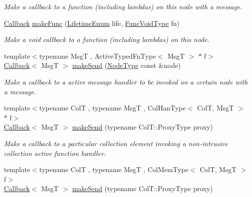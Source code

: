 \begin{DoxyCompactItemize}
\begin{DoxyCompactList}\small\item\em Make a callback to a function (including lambdas) on this node with a message. \end{DoxyCompactList}\item 
\hyperlink{namespacevt_a57b238783d05de96bc2c4027f7073b7f}{Callback} \hyperlink{structvt_1_1pipe_1_1_pipe_manager_ab1b3d375cc82e0e36e94abf7acffc8db}{make\+Func} (\hyperlink{namespacevt_1_1pipe_acb42b284378c0fdac1d7c6335dc26f58}{Lifetime\+Enum} life, \hyperlink{structvt_1_1pipe_1_1_pipe_manager_base_acd6f0c71f38f08d53f85e83b65406d77}{Func\+Void\+Type} fn)
\begin{DoxyCompactList}\small\item\em Make a void callback to a function (including lambdas) on this node. \end{DoxyCompactList}\item 
{\footnotesize template$<$typename MsgT , Active\+Typed\+Fn\+Type$<$ Msg\+T $>$ $\ast$ f$>$ }\\\hyperlink{namespacevt_a57b238783d05de96bc2c4027f7073b7f}{Callback}$<$ MsgT $>$ \hyperlink{structvt_1_1pipe_1_1_pipe_manager_a73583be6260418b13ee66e56cdade2da}{make\+Send} (\hyperlink{namespacevt_a866da9d0efc19c0a1ce79e9e492f47e2}{Node\+Type} const \&node)
\begin{DoxyCompactList}\small\item\em Make a callback to a active message handler to be invoked on a certain node with a message. \end{DoxyCompactList}\item 
{\footnotesize template$<$typename ColT , typename MsgT , Col\+Han\+Type$<$ Col\+T, Msg\+T $>$ $\ast$ f$>$ }\\\hyperlink{namespacevt_a57b238783d05de96bc2c4027f7073b7f}{Callback}$<$ MsgT $>$ \hyperlink{structvt_1_1pipe_1_1_pipe_manager_a612b59953b949edc575577e313e3b187}{make\+Send} (typename Col\+T\+::\+Proxy\+Type proxy)
\begin{DoxyCompactList}\small\item\em Make a callback to a particular collection element invoking a non-\/intrusive collection active function handler. \end{DoxyCompactList}\item 
{\footnotesize template$<$typename ColT , typename MsgT , Col\+Mem\+Type$<$ Col\+T, Msg\+T $>$ f$>$ }\\\hyperlink{namespacevt_a57b238783d05de96bc2c4027f7073b7f}{Callback}$<$ MsgT $>$ \hyperlink{structvt_1_1pipe_1_1_pipe_manager_a87e25e6a0151c0a9a48b58e6f4679b02}{make\+Send} (typename Col\+T\+::\+Proxy\+Type proxy)

\end{DoxyCompactItemize}
